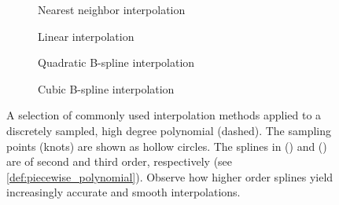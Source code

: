\begin{figure}[htpb]
    \centering
    \begin{subfigure}[b]{0.475\textwidth}
    \centering
       \caption[]{{\small Nearest neighbor interpolation}}
    \label{fig:itp_nnb}
    \end{subfigure}
    \begin{subfigure}[b]{0.475\textwidth}
    \centering
       \caption[]{{\small Linear interpolation}}
    \label{fig:itp_lin}
    \end{subfigure}

    \begin{subfigure}[b]{0.475\textwidth}
    \centering
       \caption[]{{\small Quadratic B-spline interpolation}}
    \label{fig:itp_quad}
    \end{subfigure}
    \begin{subfigure}[b]{0.475\textwidth}
    \centering
       \caption[]{{\small Cubic B-spline interpolation}}
    \label{fig:itp_cbc}
    \end{subfigure}
    \caption[A selection of commonly used interpolation methods applied to a
    discretely sampled, high degree polynomial]
    {A selection of commonly used interpolation methods applied to a discretely
        sampled, high degree polynomial (dashed). The sampling points (knots)
        are shown as hollow circles. The splines in ()
        and () are of second and third order, respectively
        (see \cref{def:piecewise_polynomial}). Observe how higher order splines
        yield increasingly accurate and smooth interpolations.
    }
    \label{fig:itp_multi}
\end{figure}
